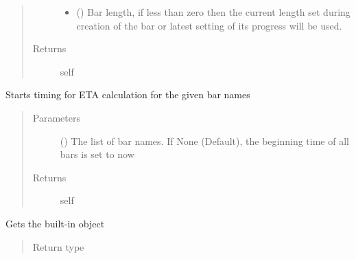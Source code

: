 \documentclass[a4paper,10pt,english]{sphinxmanual}
\begin{document}
\begin{fulllineitems}
\begin{fulllineitems}
\begin{quote}
\begin{description}
\begin{itemize}
\item {} 
 () \textendash{} Bar length, if less than zero then the current length set during creation of the bar or
latest setting of its progress will be used.

\end{itemize}

\item[{Returns}] \leavevmode
self

\end{description}\end{quote}

\end{fulllineitems}


\begin{fulllineitems}
\label{\detokenize{api/termtools.terminal.ProgressBarController:termtools.terminal.ProgressBarController.start_timing}}
Starts timing for ETA calculation for the given bar names
\begin{quote}\begin{description}
\item[{Parameters}] \leavevmode
{} () \textendash{} The list of bar names. If None (Default), the beginning time of all bars is set to
now

\item[{Returns}] \leavevmode
self

\end{description}\end{quote}

\end{fulllineitems}


\begin{fulllineitems}
\label{\detokenize{api/termtools.terminal.ProgressBarController:termtools.terminal.ProgressBarController.terminal}}
Gets the built-in  object
\begin{quote}\begin{description}
\item[{Return type}] \leavevmode
{}


\end{description}
\end{quote}
\end{fulllineitems}
\end{fulllineitems}
\end{document}
